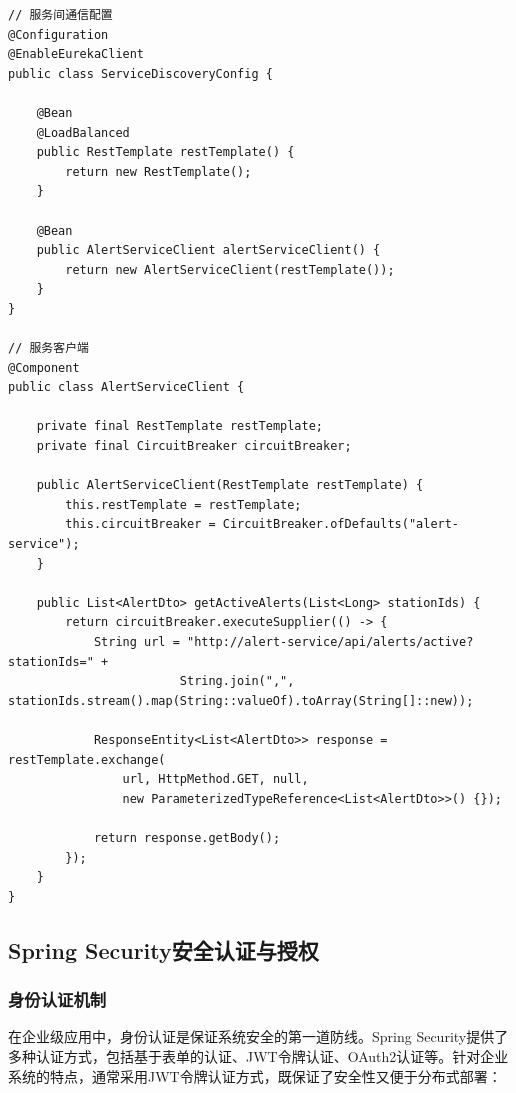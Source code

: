 \begin{lstlisting}[style=java]
// 服务间通信配置
@Configuration
@EnableEurekaClient
public class ServiceDiscoveryConfig {
    
    @Bean
    @LoadBalanced
    public RestTemplate restTemplate() {
        return new RestTemplate();
    }
    
    @Bean
    public AlertServiceClient alertServiceClient() {
        return new AlertServiceClient(restTemplate());
    }
}

// 服务客户端
@Component
public class AlertServiceClient {
    
    private final RestTemplate restTemplate;
    private final CircuitBreaker circuitBreaker;
    
    public AlertServiceClient(RestTemplate restTemplate) {
        this.restTemplate = restTemplate;
        this.circuitBreaker = CircuitBreaker.ofDefaults("alert-service");
    }
    
    public List<AlertDto> getActiveAlerts(List<Long> stationIds) {
        return circuitBreaker.executeSupplier(() -> {
            String url = "http://alert-service/api/alerts/active?stationIds=" + 
                        String.join(",", stationIds.stream().map(String::valueOf).toArray(String[]::new));
                        
            ResponseEntity<List<AlertDto>> response = restTemplate.exchange(
                url, HttpMethod.GET, null, 
                new ParameterizedTypeReference<List<AlertDto>>() {});
                
            return response.getBody();
        });
    }
}
\end{lstlisting}

\hypertarget{spring-securityux5b89ux5168ux8ba4ux8bc1ux4e0eux6388ux6743}{%
\subsection{Spring Security安全认证与授权}\label{spring-securityux5b89ux5168ux8ba4ux8bc1ux4e0eux6388ux6743}}

\hypertarget{ux8eabux4efdux8ba4ux8bc1ux673aux5236}{%
\subsubsection{身份认证机制}\label{ux8eabux4efdux8ba4ux8bc1ux673aux5236}}

在企业级应用中，身份认证是保证系统安全的第一道防线。Spring Security提供了多种认证方式，包括基于表单的认证、JWT令牌认证、OAuth2认证等。针对企业系统的特点，通常采用JWT令牌认证方式，既保证了安全性又便于分布式部署：

